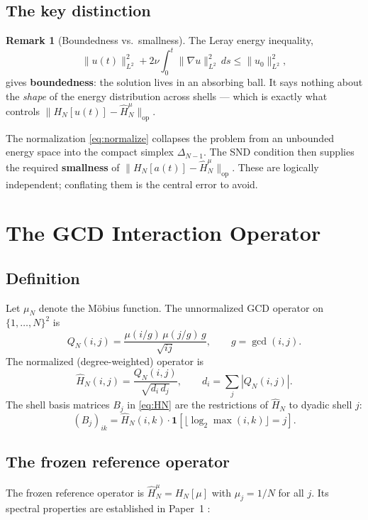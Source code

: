 \documentclass[12pt]{amsart}
\theoremstyle{definition}
\newtheorem{remark}[theorem]{Remark}
\newcommand{\HN}{\widehat{H}_N^\mu}
\begin{document}
\subsection{The key distinction}

\begin{remark}[Boundedness vs.\ smallness]
\label{rem:leray}
The Leray energy inequality,
\[
\|u(t)\|_{L^2}^2
+2\nu\!\int_0^t\!\|\nabla u\|_{L^2}^2\,ds
\le\|u_0\|_{L^2}^2,
\]
gives \textbf{boundedness}: the solution lives in an absorbing ball.
It says nothing about the \emph{shape} of the energy distribution
across shells — which is exactly what controls
$\|H_N[u(t)]-\HN\|_{\mathrm{op}}$.

The normalization \eqref{eq:normalize} collapses the problem from
an unbounded energy space into the compact simplex $\Delta_{N-1}$.
The SND condition then supplies the required \textbf{smallness}
of $\|H_N[a(t)]-\HN\|_{\mathrm{op}}$.
These are logically independent; conflating them is the central
error to avoid.
\end{remark}

\section{The GCD Interaction Operator}
\label{sec:operator}

\subsection{Definition}

Let $\mu_N$ denote the Möbius function. The unnormalized GCD
operator on $\{1,\dots,N\}^2$ is
\[
Q_N(i,j) = \frac{\mu(i/g)\,\mu(j/g)\,g}{\sqrt{ij}},
\qquad g=\gcd(i,j).
\]
The normalized (degree-weighted) operator is
\[
\widehat H_N(i,j) = \frac{Q_N(i,j)}{\sqrt{d_i\,d_j}},
\qquad d_i = \sum_j |Q_N(i,j)|.
\]
The shell basis matrices $B_j$ in \eqref{eq:HN} are the restrictions
of $\widehat H_N$ to dyadic shell $j$:
\[
(B_j)_{ik} = \widehat H_N(i,k)\cdot
\mathbf{1}[\lfloor\log_2\max(i,k)\rfloor = j].
\]

\subsection{The frozen reference operator}

The frozen reference operator is $\HN = H_N[\mu]$ with
$\mu_j=1/N$ for all $j$. Its spectral properties are established
in Paper~1 \cite{Simons2026a}:
\end{document}

